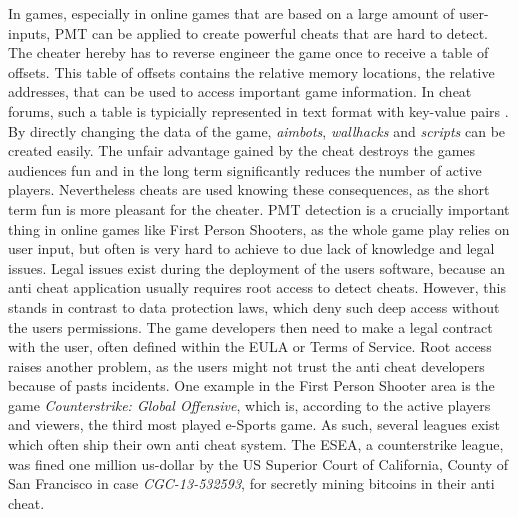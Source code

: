 In games, especially in online games that are based on a large amount of user-inputs, \gls{PMT} can be applied to create powerful cheats that are hard to detect. The cheater hereby has to reverse engineer the game once to receive a table of offsets. This table of offsets contains the relative memory locations, the relative addresses, that can be used to access important game information. In cheat forums, such a table is typicially represented in text format with key-value pairs \cite{offsets}. By directly changing the data of the game, \emph{aimbots}, \emph{wallhacks} and \emph{scripts} can be created easily. The unfair advantage gained by the cheat destroys the games audiences fun and in the long term significantly reduces the number of active players. Nevertheless cheats are used knowing these consequences, as the short term fun is more pleasant for the cheater. \gls{PMT} detection is a crucially important thing in online games like First Person Shooters, as the whole game play relies on user input, but often is very hard to achieve to due lack of knowledge and legal issues. Legal issues exist during the deployment of the users software, because an anti cheat application usually requires root access to detect cheats. However, this stands in contrast to data protection laws, which deny such deep access without the users permissions. The game developers then need to make a legal contract with the user, often defined within the \gls{EULA} or Terms of Service. Root access raises another problem, as the users might not trust the anti cheat developers because of pasts incidents. One example in the First Person Shooter area is the game \emph{Counterstrike: Global Offensive}, which is, according to the active players and viewers, the third most played e-Sports game. As such, several leagues exist which often ship their own anti cheat system. The \gls{ESEA}, a counterstrike league, was fined one million us-dollar by the US Superior Court of California, County of San Francisco \cite{esea} in case \emph{CGC-13-532593}, for secretly mining bitcoins in their anti cheat. 